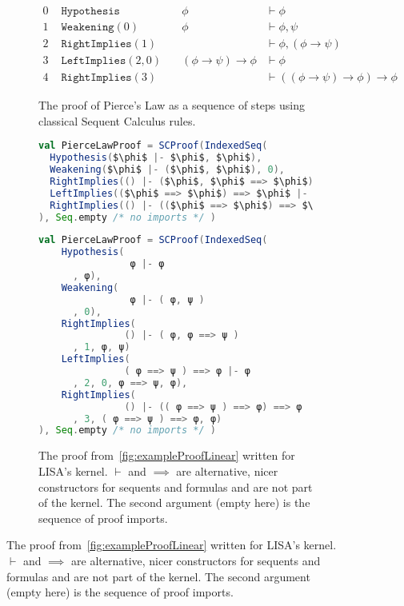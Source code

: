 \begin{figure}[ht]
  \centering
  \begin{subfigure}{\linewidth}
    \begin{align*}
      0 & \texttt { Hypothesis}       & \quad \phi                     & \vdash \phi                                \\
      1 & \texttt { Weakening}(0)     & \quad  \phi                    & \vdash \phi, \psi                          \\
      2 & \texttt { RightImplies}(1)  & \quad                          & \vdash \phi, (\phi \to \psi)               \\
      3 & \texttt { LeftImplies}(2,0) & \quad (\phi \to \psi) \to \phi & \vdash \phi                                \\
      4 & \texttt { RightImplies}(3)  & \quad                          & \vdash ((\phi \to \psi) \to \phi) \to \phi
    \end{align*}

    \caption{The proof of Pierce's Law as a sequence of steps using classical Sequent Calculus rules.}
    \label{fig:exampleProofLinear}

  \end{subfigure}


  \begin{subfigure}{\linewidth}
    \begin{lstlisting}[language=scala, showspaces=true]
val PierceLawProof = SCProof(IndexedSeq(
  Hypothesis($\phi$ |- $\phi$, $\phi$),
  Weakening($\phi$ |- ($\phi$, $\phi$), 0),
  RightImplies(() |- ($\phi$, $\phi$ ==> $\phi$), 1, $\phi$, $\phi$)
  LeftImplies(($\phi$ ==> $\phi$) ==> $\phi$ |- $\phi$, 2, 0, $\phi$ ==> $\phi$, $\phi$),
  RightImplies(() |- (($\phi$ ==> $\phi$) ==> $\phi$) ==> $\phi$, 3, ($\phi$ ==> $\phi$) ==> $\phi$, $\phi$)
), Seq.empty /* no imports */ )
  \end{lstlisting}
    \begin{lstlisting}[language=scala, showspaces=true]
val PierceLawProof = SCProof(IndexedSeq(
    Hypothesis( 
                φ |- φ
      , φ),
    Weakening( 
                φ |- ( φ, ψ )
      , 0),
    RightImplies(
               () |- ( φ, φ ==> ψ )
      , 1, φ, ψ)
    LeftImplies(
               ( φ ==> ψ ) ==> φ |- φ
      , 2, 0, φ ==> ψ, φ),
    RightImplies(
               () |- (( φ ==> ψ ) ==> φ) ==> φ
      , 3, ( φ ==> ψ ) ==> φ, φ)
), Seq.empty /* no imports */ )
    \end{lstlisting}
    \caption{The proof from~\autoref{fig:exampleProofLinear} written for LISA's kernel. $\vdash$ and $\implies$ are alternative, nicer constructors for sequents and formulas and are not part of the kernel. The second argument (empty here) is the sequence of proof imports.}
    \label{fig:ExampleProofLinearScala}
  \end{subfigure}
\end{figure}

